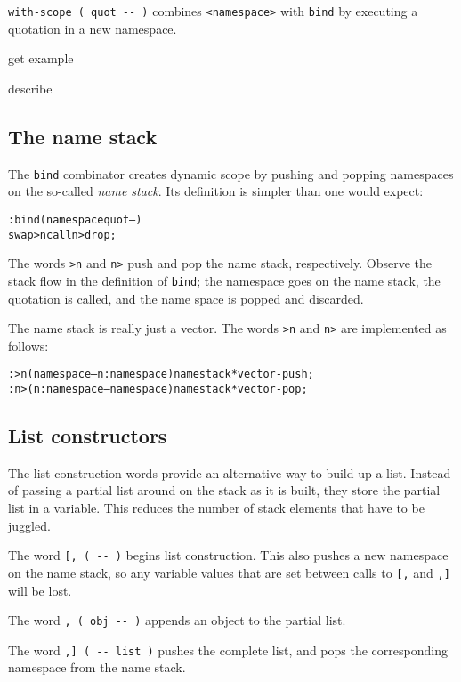 \documentclass[english]{article}
\begin{document}
{\texttt{with-scope ( quot -{}- )} combines \texttt{<namespace>} with \texttt{bind} by executing a quotation in a new namespace.

get example

describe

\subsection{The name stack}

The \texttt{bind} combinator creates dynamic scope by pushing and popping namespaces on the so-called \emph{name stack}. Its definition is simpler than one would expect:

\begin{alltt}
: bind ( namespace quot -- )
    swap >n call n> drop ;
\end{alltt}

The words \texttt{>n} and \texttt{n>} push and pop the name stack, respectively. Observe the stack flow in the definition of \texttt{bind}; the namespace goes on the name stack, the quotation is called, and the name space is popped and discarded.

The name stack is really just a vector. The words \texttt{>n} and \texttt{n>} are implemented as follows:

\begin{alltt}
: >n ( namespace -- n:namespace ) namestack* vector-push ;
: n> ( n:namespace -- namespace ) namestack* vector-pop ;
\end{alltt}

\subsection{\label{sub:List-constructors}List constructors}

The list construction words provide an alternative way to build up a list. Instead of passing a partial list around on the stack as it is built, they store the partial list in a variable. This reduces the number
of stack elements that have to be juggled.

The word \texttt{{[}, ( -{}- )} begins list construction. This also pushes a new namespace on the name stack, so any variable values that are set between calls to \texttt{[,} and \texttt{,]} will be lost.

The word \texttt{, ( obj -{}- )} appends an object to the partial
list.

The word \texttt{,{]} ( -{}- list )} pushes the complete list, and pops the corresponding namespace from the name stack.

}
\end{document}
